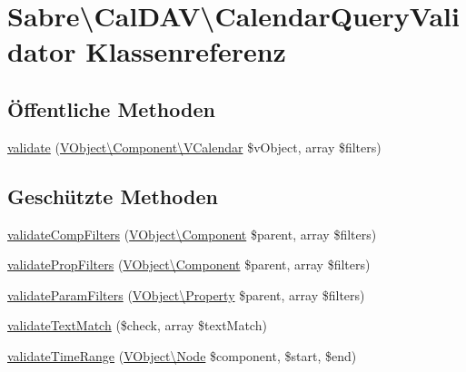 \hypertarget{class_sabre_1_1_cal_d_a_v_1_1_calendar_query_validator}{}\section{Sabre\textbackslash{}Cal\+D\+AV\textbackslash{}Calendar\+Query\+Validator Klassenreferenz}
\label{class_sabre_1_1_cal_d_a_v_1_1_calendar_query_validator}
\subsection*{Öffentliche Methoden}
\begin{DoxyCompactItemize}
\item 
\mbox{\hyperlink{class_sabre_1_1_cal_d_a_v_1_1_calendar_query_validator_acc59d0c2a512557c9ad291e65762fe6c}{validate}} (\mbox{\hyperlink{class_sabre_1_1_v_object_1_1_component_1_1_v_calendar}{V\+Object\textbackslash{}\+Component\textbackslash{}\+V\+Calendar}} \$v\+Object, array \$filters)
\end{DoxyCompactItemize}
\subsection*{Geschützte Methoden}
\begin{DoxyCompactItemize}
\item 
\mbox{\hyperlink{class_sabre_1_1_cal_d_a_v_1_1_calendar_query_validator_ab03f2a3891827550be41971f3288242a}{validate\+Comp\+Filters}} (\mbox{\hyperlink{class_sabre_1_1_v_object_1_1_component}{V\+Object\textbackslash{}\+Component}} \$parent, array \$filters)
\item 
\mbox{\hyperlink{class_sabre_1_1_cal_d_a_v_1_1_calendar_query_validator_a4dc37f4b1d5e2157a8a2b756b057c69c}{validate\+Prop\+Filters}} (\mbox{\hyperlink{class_sabre_1_1_v_object_1_1_component}{V\+Object\textbackslash{}\+Component}} \$parent, array \$filters)
\item 
\mbox{\hyperlink{class_sabre_1_1_cal_d_a_v_1_1_calendar_query_validator_aad38620b45ef8ff83fdf0005eb04b2c4}{validate\+Param\+Filters}} (\mbox{\hyperlink{class_sabre_1_1_v_object_1_1_property}{V\+Object\textbackslash{}\+Property}} \$parent, array \$filters)
\item 
\mbox{\hyperlink{class_sabre_1_1_cal_d_a_v_1_1_calendar_query_validator_addd29269c57d2be2c4c5408b7e28e800}{validate\+Text\+Match}} (\$check, array \$text\+Match)
\item 
\mbox{\hyperlink{class_sabre_1_1_cal_d_a_v_1_1_calendar_query_validator_a2fa19b566b8b1fff7ce656198597b942}{validate\+Time\+Range}} (\mbox{\hyperlink{class_sabre_1_1_v_object_1_1_node}{V\+Object\textbackslash{}\+Node}} \$component, \$start, \$end)
\end{DoxyCompactItemize}


